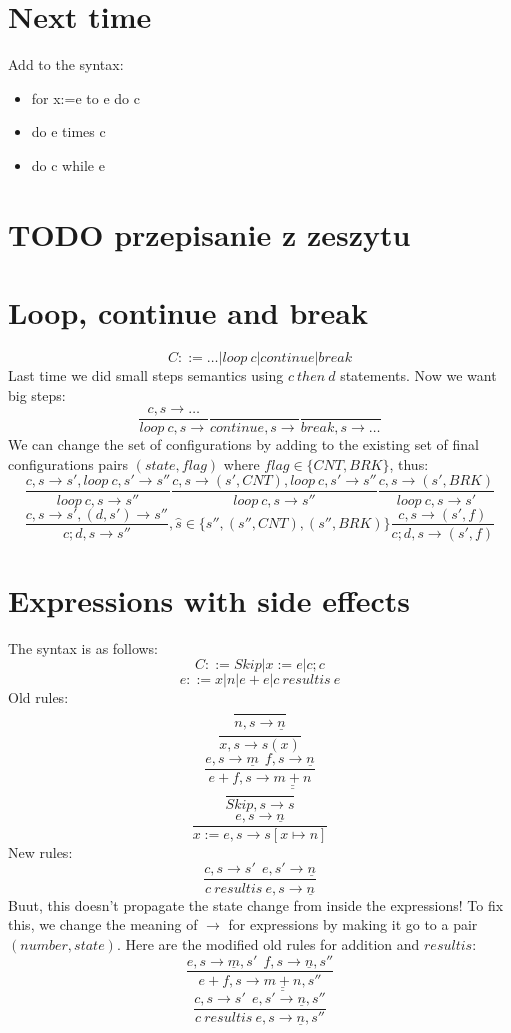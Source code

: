 \documentclass{article}
\begin{document}
\section{Next time}
Add to the syntax:
\begin{itemize}
	\item for x:=e to e do c 
	\item do e times c
	\item do c while e
\end{itemize}
\section{TODO przepisanie z zeszytu}
\section{Loop, continue and break}
$$C::=\ldots | loop\ c | continue | break$$
Last time we did small steps semantics using $c\ then\ d$ statements. Now we want big steps:
$$\frac{c,s\rightarrow\ldots}{loop\ c,s\rightarrow}\frac{}{continue,s\rightarrow}\frac{}{break,s\rightarrow\ldots}$$
We can change the set of configurations by adding to the existing set of final configurations pairs $(state, flag)$ where $flag\in \{CNT, BRK\}$, thus:
$$\frac{c,s\rightarrow s', loop\ c, s'\rightarrow s''}{loop\ c,s\rightarrow s''}
\frac{c,s\rightarrow (s', CNT), loop\ c, s'\rightarrow s''}{loop\ c,s\rightarrow s''}
\frac{c,s\rightarrow (s', BRK)}{loop\ c,s\rightarrow s'}$$
$$\frac{c,s\rightarrow s',(d,s')\rightarrow s'' }{c;d,s\rightarrow s''}, \hat s\in\{s'', (s'',CNT), (s'',BRK)\}
\frac{c,s\rightarrow (s', f)}{c;d,s\rightarrow (s', f)}
$$
\section{Expressions with side effects}
The syntax is as follows:
$$C::=Skip | x:=e | c;c$$$$e::=x|n|e+e|c\ resultis\ e$$
Old rules:
$$\frac{}{n,s\rightarrow \underline{n}}$$
$$\frac{}{x,s\rightarrow s(x)}$$
$$\frac{e,s\rightarrow \underline{m}\ \ f,s\rightarrow \underline{n}}{e+f,s\rightarrow \underline{\underline{m+n}}}$$
$$\frac{}{Skip,s\rightarrow s}$$
$$\frac{e,s\rightarrow \underline{n}}{x:=e,s\rightarrow s[x\mapsto n]}$$
New rules:
$$\frac{c,s\rightarrow s'\ \ e,s'\rightarrow \underline{n}}{c\ resultis\ e,s\rightarrow \underline{n}}$$
Buut, this doesn't propagate the state change from inside the expressions! To fix this, we change the meaning of $ \rightarrow $ for expressions by making it go to a pair $ (number, state)$. Here are the modified old rules for addition and $resultis$:
$$\frac{e,s\rightarrow \underline{m}, s'\ \ f,s\rightarrow \underline{n}, s''}{e+f,s\rightarrow \underline{\underline{m+n}}, s''}$$
$$\frac{c,s\rightarrow s'\ \ e,s'\rightarrow \underline{n}, s''}{c\ resultis\ e,s\rightarrow \underline{n}, s''}$$
\end{document}
